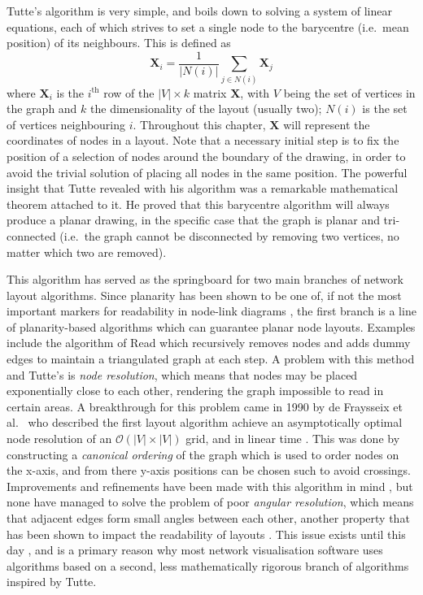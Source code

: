 Tutte's algorithm is very simple, and boils down to solving a system of linear equations, each of which strives to set a single node to the barycentre (i.e.\ mean position) of its neighbours. This is defined as 
\begin{equation}
  \mathbf{X}_i = \frac{1}{|N(i)|}\sum_{j\in N(i)}\mathbf{X}_j
\label{eq:tutte}
\end{equation}
where $\mathbf{X}_i$ is the $i^\text{th}$ row of the $|V|\times k$ matrix $\mathbf{X}$, with $V$ being the set of vertices in the graph and $k$ the dimensionality of the layout (usually two); $N(i)$ is the set of vertices neighbouring $i$.
Throughout this chapter, $\mathbf{X}$ will represent the coordinates of nodes in a layout.
Note that a necessary initial step is to fix the position of a selection of nodes around the boundary of the drawing, in order to avoid the trivial solution of placing all nodes in the same position.
The powerful insight that Tutte revealed with his algorithm was a remarkable mathematical theorem attached to it. He proved that this barycentre algorithm will always produce a planar drawing, in the specific case that the graph is planar and tri-connected (i.e.\ the graph cannot be disconnected by removing two vertices, no matter which two are removed).

This algorithm has served as the springboard for two main branches of network layout algorithms. Since planarity has been shown to be one of, if not the most important markers for readability in node-link diagrams \cite{Purchase1997}, the first branch is a line of planarity-based algorithms which can guarantee planar node layouts. Examples include the algorithm of Read \cite{Read1987} which recursively removes nodes and adds dummy edges to maintain a triangulated graph at each step.  A problem with this method and Tutte's is \emph{node resolution}, which means that nodes may be placed exponentially close to each other, rendering the graph impossible to read in certain areas.
A breakthrough for this problem came in 1990 by de Fraysseix et al.\ \cite{DeFraysseix1990} who described the first layout algorithm achieve an asymptotically optimal node resolution of an $\mathcal{O}(|V|\times |V|)$ grid, and in linear time \cite{Chrobak1995}. This was done by constructing a \emph{canonical ordering} of the graph \cite{Zhang2005} which is used to order nodes on the x-axis, and from there y-axis positions can be chosen such to avoid crossings.
Improvements and refinements have been made with this algorithm in mind \cite{Zhang2005}, but none have managed to solve the problem of poor \emph{angular resolution}, which means that adjacent edges form small angles between each other, another property that has been shown to impact the readability of layouts \cite{Purchase1997}.
This issue exists until this day \cite{Eades2012}, and is a primary reason why most network visualisation software uses algorithms based on a second, less mathematically rigorous branch of algorithms inspired by Tutte.


